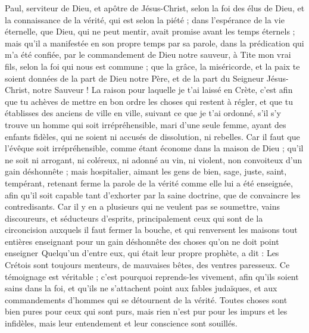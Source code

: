 \begin{multicols}{2}
\VerseOne{}Paul, serviteur de Dieu, et apôtre de Jésus-Christ, selon la foi des élus de Dieu, et la connaissance de la vérité, qui est selon la piété ;
dans l'espérance de la vie éternelle, que Dieu, qui ne peut mentir, avait promise avant les temps éternels ;
mais qu’il a manifestée en son propre temps par sa parole, dans la prédication qui m’a été confiée, par le commandement de Dieu notre sauveur,
à Tite mon vrai fils, selon la foi qui nous est commune ; que la grâce, la miséricorde, et la paix te soient données de la part de Dieu notre Père, et de la part du Seigneur Jésus-Christ, notre Sauveur !
La raison pour laquelle je t'ai laissé en Crète, c'est afin que tu achèves de mettre en bon ordre les choses qui restent à régler, et que tu établisses des anciens de ville en ville, suivant ce que je t'ai ordonné,
s'il s'y trouve un homme qui soit irrépréhensible, mari d'une seule femme, ayant des enfants fidèles, qui ne soient ni accusés de dissolution, ni rebelles.
Car il faut que l'évêque soit irrépréhensible, comme étant économe dans la maison de Dieu ; qu’il ne soit ni arrogant, ni coléreux, ni adonné au vin, ni violent, non convoiteux d’un gain déshonnête ;
mais hospitalier, aimant les gens de bien, sage, juste, saint, tempérant,
retenant ferme la parole de la vérité comme elle lui a été enseignée, afin qu’il soit capable tant d’exhorter par la saine doctrine, que de convaincre les contredisants.
Car il y en a plusieurs qui ne veulent pas se soumettre, vains discoureurs, et séducteurs d’esprits, principalement ceux qui sont de la circoncision
auxquels il faut fermer la bouche, et qui renversent les maisons tout entières enseignant pour un gain déshonnête des choses qu’on ne doit point enseigner 
Quelqu'un d'entre eux, qui était leur propre prophète, a dit : Les Crétois sont toujours menteurs, de mauvaises bêtes, des ventres paresseux.
Ce témoignage est véritable ; c'est pourquoi reprends-les vivement, afin qu'ils soient sains dans la foi,
et qu’ils ne s’attachent point aux fables judaïques, et aux commandements d’hommes qui se détournent de la vérité.
Toutes choses sont bien pures pour ceux qui sont purs, mais rien n’est pur pour les impurs et les infidèles, mais leur entendement et leur conscience sont souillés.

\end{multicols}
